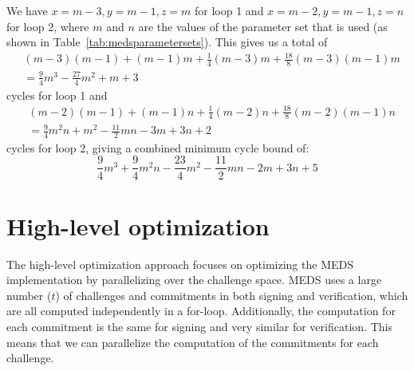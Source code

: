 \documentclass[11pt,a4paper]{report}
\theoremstyle{definition}
\begin{document}
We have $x = m - 3, y = m - 1, z = m$ for loop 1 and $x = m - 2, y = m - 1, z = n$ for loop 2, where $m$ and $n$ are the values of the parameter set that is used (as shown in Table~\ref{tab:medsparametersets}). This gives us a total of
\begin{align*}
  &(m - 3)(m - 1) + (m - 1)m + \frac{1}{4}(m - 3)m + \frac{18}{8}(m - 3)(m - 1)m\\
  &= \frac{9}{4} m^3 - \frac{27}{4} m^2 + m + 3
\end{align*}
cycles for loop 1 and
\begin{align*}
  &(m - 2)(m - 1) + (m - 1)n + \frac{1}{4}(m - 2)n + \frac{18}{8}(m - 2)(m - 1)n\\
  &= \frac{9}{4} m^2 n + m^2 - \frac{11}{2} m n - 3 m + 3 n + 2
\end{align*}
cycles for loop 2, giving a combined minimum cycle bound of:
\[
  \frac{9}{4} m^3 + \frac{9}{4} m^2 n - \frac{23}{4} m^2 - \frac{11}{2} m n - 2 m + 3 n + 5
\]


\section{High-level optimization}
\label{sec:highleveloptimization}
The high-level optimization approach focuses on optimizing the MEDS implementation by parallelizing over the challenge space. MEDS uses a large number ($t$) of challenges and commitments in both signing and verification, which are all computed independently in a for-loop. Additionally, the computation for each commitment is the same for signing and very similar for verification. This means that we can parallelize the computation of the commitments for each challenge.
\end{document}
